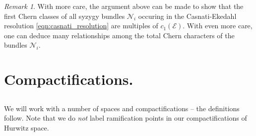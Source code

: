 \documentclass[reqno, 10 pt]{article}
\theoremstyle{definition}
\theoremstyle{remark}
\newtheorem{rmk}[thm]{Remark}
\numberwithin{equation}{section}
\numberwithin{thm}{section}
\numberwithin{prop}{section}
\numberwithin{lem}{section}
\numberwithin{cor}{section}
\numberwithin{conj}{section}
\numberwithin{defn}{section}
\newcommand{\cE}{{\mathcal E}}
\newcommand{\cN}{{\mathcal N}}
\begin{document}
\begin{rmk}
With more care, the argument above can be made to show that the first Chern classes of all syzygy bundles $\cN_{i}$ occuring in the Casnati-Ekedahl resolution \ref{eqn:casnati_resolution} are multiples of $c_{1}(\cE)$. With even more care, one can deduce many relationships among the total Chern characters of the bundles $\cN_{i}$.
\end{rmk}




\section{Compactifications.}\label{SecondSection}

\subsection{}
  We will work with a number of spaces and compactifications -- the definitions follow. Note that we do {\sl not} label ramification points in our compactifications of Hurwitz space.
\end{document}
